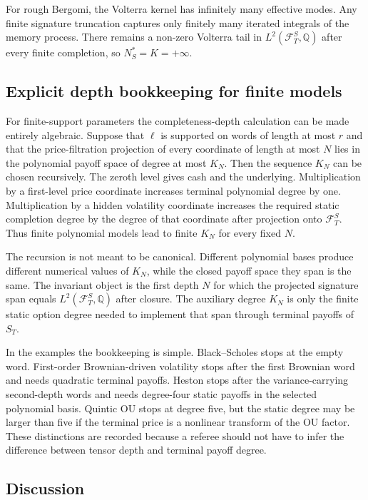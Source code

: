 \documentclass[11pt,oneside]{article}
\theoremstyle{plain}
\theoremstyle{definition}
\theoremstyle{remark}
\newcommand{\Q}{\mathbb{Q}}
\newcommand{\FS}{\mathcal F^S}
\begin{document}
For rough Bergomi, the Volterra kernel has infinitely many effective modes. Any finite signature truncation captures only finitely many iterated integrals of the memory process. There remains a non-zero Volterra tail in $L^2(\FS_T,\Q)$ after every finite completion, so $N_S^\ast=K=+\infty$.



\subsection{Explicit depth bookkeeping for finite models}
\label{subsec:explicit-depth-bookkeeping}
For finite-support parameters the completeness-depth calculation can be made entirely algebraic. Suppose that $\ell$ is supported on words of length at most $r$ and that the price-filtration projection of every coordinate of length at most $N$ lies in the polynomial payoff space of degree at most $K_N$. Then the sequence $K_N$ can be chosen recursively. The zeroth level gives cash and the underlying. Multiplication by a first-level price coordinate increases terminal polynomial degree by one. Multiplication by a hidden volatility coordinate increases the required static completion degree by the degree of that coordinate after projection onto $\FS_T$. Thus finite polynomial models lead to finite $K_N$ for every fixed $N$.

The recursion is not meant to be canonical. Different polynomial bases produce different numerical values of $K_N$, while the closed payoff space they span is the same. The invariant object is the first depth $N$ for which the projected signature span equals $L^2(\FS_T,\Q)$ after closure. The auxiliary degree $K_N$ is only the finite static option degree needed to implement that span through terminal payoffs of $S_T$.

In the examples the bookkeeping is simple. Black--Scholes stops at the empty word. First-order Brownian-driven volatility stops after the first Brownian word and needs quadratic terminal payoffs. Heston stops after the variance-carrying second-depth words and needs degree-four static payoffs in the selected polynomial basis. Quintic OU stops at degree five, but the static degree may be larger than five if the terminal price is a nonlinear transform of the OU factor. These distinctions are recorded because a referee should not have to infer the difference between tensor depth and terminal payoff degree.


\subsection{Discussion}
\end{document}
